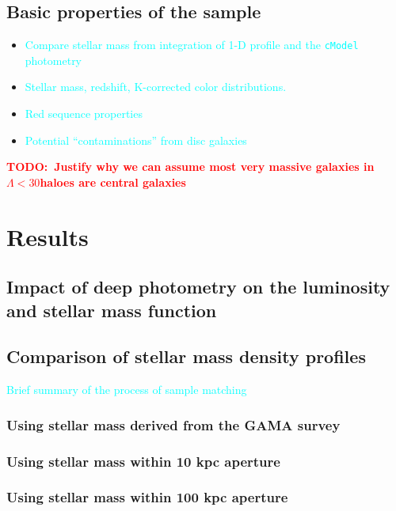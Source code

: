 \documentclass[preprint]{aastex}
\def\nonbcg{$\Lambda < 30$}
\newcommand{\todo}[1]{\textcolor{red}{\textbf{TODO:~#1}}}
\newcommand{\plan}[1]{\textcolor{cyan}{#1}}
\begin{document}
\begin{CJK*}{UTF8}{gbsn}
\subsection{Basic properties of the sample}

    \begin{itemize}
        \item \plan{Compare stellar mass from integration of 1-D profile and the 
            \texttt{cModel} photometry}
        \item \plan{Stellar mass, redshift, K-corrected color distributions.}
        \item \plan{Red sequence properties}    
        \item \plan{Potential ``contaminations'' from disc galaxies}
    \end{itemize}
    
    \todo{Justify why we can assume most very massive galaxies in \nonbcg haloes are
        central galaxies}


\section{Results}

\subsection{Impact of deep photometry on the luminosity and stellar mass function}

\subsection{Comparison of stellar mass density profiles}

    \plan{Brief summary of the process of sample matching}

\subsubsection{Using stellar mass derived from the GAMA survey}

\subsubsection{Using stellar mass within 10 kpc aperture}

\subsubsection{Using stellar mass within 100 kpc aperture}


\end{CJK*}
\end{document}
